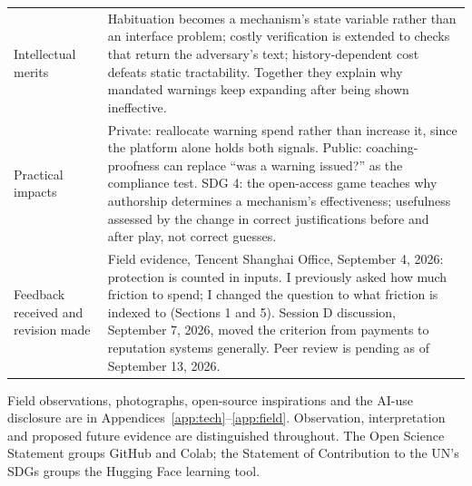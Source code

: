 \begin{table}[H]
\begin{tabularx}{\textwidth}{@{}p{}Y@{}}
Intellectual merits & Habituation becomes a mechanism's state variable rather than an interface problem; costly verification is extended to checks that return the adversary's text; history-dependent cost defeats static tractability. Together they explain why mandated warnings keep expanding after being shown ineffective. \\
Practical impacts & Private: reallocate warning spend rather than increase it, since the platform alone holds both signals. Public: coaching-proofness can replace ``was a warning issued?'' as the compliance test. SDG 4: the open-access game teaches why authorship determines a mechanism's effectiveness; usefulness assessed by the change in correct justifications before and after play, not correct guesses. \\
Feedback received and revision made & Field evidence, Tencent Shanghai Office, September 4, 2026: protection is counted in inputs. I previously asked how much friction to spend; I changed the question to what friction is indexed to (Sections 1 and 5). Session D discussion, September 7, 2026, moved the criterion from payments to reputation systems generally. Peer review is pending as of September 13, 2026. \\
\bottomrule
\end{tabularx}
\end{table}
\noindent Field observations, photographs, open-source inspirations and the AI-use disclosure are in Appendices~\ref{app:tech}--\ref{app:field}. Observation, interpretation and proposed future evidence are distinguished throughout. The Open Science Statement groups GitHub and Colab; the Statement of Contribution to the UN's SDGs groups the Hugging Face learning tool.
